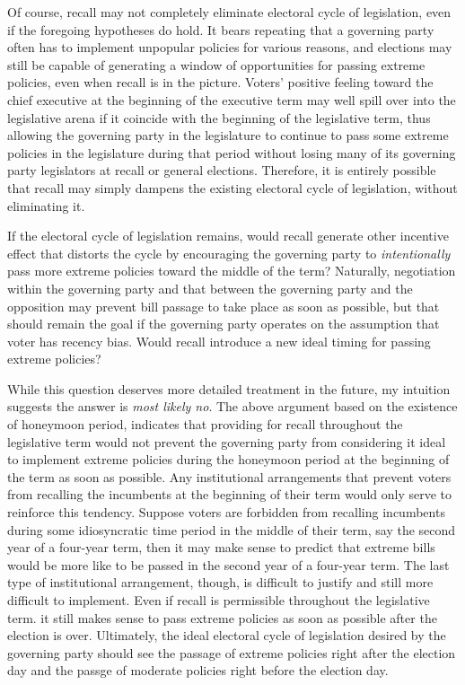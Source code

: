 \documentclass{article}
\begin{document}
		Of course,
		recall may not completely eliminate electoral cycle of legislation,
		even if
		the foregoing hypotheses do hold.
		It bears repeating that a governing party
		often has to implement unpopular policies for various reasons,
		and elections may still be capable of generating
		a window of opportunities for passing extreme policies,
		even when recall is in the picture.
		Voters' positive feeling toward the chief executive
		at the beginning of the executive term
		\autocite{beckmannPolicyOpportunitiesPresidential2007,
			bondMarginalTimeVaryingEffect2003,
			castrocornejoElectionDayPresidential2022,
			dewanDynamicGovernmentPerformance2012,
			elgieProximityCandidatesPresidential2014}
		may well spill over into the legislative arena
		if it
		coincide with the beginning of the legislative term,
		thus allowing the governing party in the legislature
		to continue to pass some extreme policies in the legislature during that period
		without losing many of its governing party legislators
		at recall or general elections.
		Therefore, it is entirely possible that
		recall
		may simply dampens the existing electoral cycle of legislation,
		without eliminating it.
		
		If the electoral cycle of legislation remains,
		would recall generate other incentive effect
		that distorts the cycle by encouraging the governing party
		to \textit{intentionally} pass more extreme policies
		toward the middle of the term?
		Naturally,
		negotiation within the governing party and
		that between the governing party and the opposition
		may prevent bill passage to take place as soon as possible,
		but that should remain the goal if the governing party operates on
		the assumption that voter has recency bias.
		Would recall introduce a new ideal timing for passing extreme policies?
		
		While this question deserves
		more detailed treatment in the future,
		my intuition suggests
		the answer is \textit{most likely no}.
		The above argument based on the existence of honeymoon period,
		indicates that providing for recall throughout the legislative term
		would not prevent the governing party from
		considering it ideal to implement extreme policies
		during the honeymoon period at the beginning of the term
		as soon as possible.
		Any institutional arrangements
		that prevent voters from recalling the incumbents
		at the beginning of their term would only serve to reinforce this tendency.
		Suppose voters are forbidden from
		recalling incumbents
		during some idiosyncratic time period in the middle of their term,
		say the second year of a four-year term,
		then it may make sense to predict that
		extreme bills would be more like
		to be passed in the second year of a four-year term.
		The last type of institutional arrangement,
		though,
		is difficult to justify and still more difficult to implement.
		Even if recall is permissible throughout the legislative term.
		it still makes sense to pass extreme policies
		as soon as possible after the election is over.
		Ultimately,
		the ideal electoral cycle of legislation desired by the governing party
		should see the passage of extreme policies
		right after the election day
		and the passge of moderate policies right before the election day.
		
\end{document}
